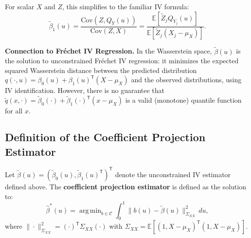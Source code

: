 \documentclass[12pt]{article}
\newcommand{\E}{\mathbb{E}}
\newcommand{\Cov}{\mathrm{Cov}}
\newcommand{\T}{\mathsf{T}}
\DeclareMathOperator*{\argmin}{arg\,min}
\begin{document}
For scalar $X$ and $Z$, this simplifies to the familiar IV formula:
\begin{equation}\label{eq:iv-scalar}
\tilde{\beta}_1(u) = \frac{\Cov(Z, Q_Y(u))}{\Cov(Z, X)} = \frac{\E[\tilde{Z}_j Q_{Y_j}(u)]}{\E[\tilde{Z}_j (X_j - \mu_X)]}.
\end{equation}

\textbf{Connection to Fréchet IV Regression.} In the Wasserstein space, $\tilde{\beta}(u)$ is the solution to unconstrained Fréchet IV regression: it minimizes the expected squared Wasserstein distance between the predicted distribution $q(\cdot, u) = \beta_0(u) + \beta_1(u)^\T(X - \mu_X)$ and the observed distributions, using IV identification. However, there is no guarantee that $\tilde{q}(x, \cdot) = \tilde{\beta}_0(\cdot) + \tilde{\beta}_1(\cdot)^\T(x - \mu_X)$ is a valid (monotone) quantile function for all $x$.

\subsection{Definition of the Coefficient Projection Estimator}

Let $\tilde{\beta}(u) = (\tilde{\beta}_0(u), \tilde{\beta}_1(u)^\T)^\T$ denote the unconstrained IV estimator defined above. The \textbf{coefficient projection estimator} is defined as the solution to:
\begin{equation}\label{eq:coef-proj-def}
\hat{\beta}^*(u) = \argmin_{b \in \mathcal{C}} \int_0^1 \|b(u) - \tilde{\beta}(u)\|_{\Sigma_{XX}}^2 \, du,
\end{equation}
where $\|\cdot\|_{\Sigma_{XX}}^2 = (\cdot)^\T \Sigma_{XX} (\cdot)$ with $\Sigma_{XX} = \E[(1, X-\mu_X)^\T(1, X-\mu_X)]$.
\end{document}
